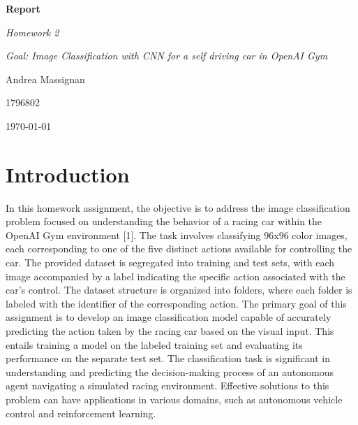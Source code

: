 \documentclass{article}
\begin{document}
\begin{titlepage}
    \centering
    \vspace*{2cm}
    {\Huge\bfseries Report\par}
    \vspace{2cm}
    {\Large\itshape Homework 2\par}
    \vspace{0.5cm}
    {\large\itshape Goal: Image Classification with CNN for a self driving car in OpenAI Gym\par}
    \vfill
    {\Large Andrea Massignan\par}
    {\Large 1796802\par}
    \vfill
    {\large\today\par}
\end{titlepage}

\section{Introduction}

In this homework assignment, the objective is to address the image classification problem focused on understanding the behavior of a racing car within the OpenAI Gym environment [1]. The task involves classifying 96x96 color images, each corresponding to one of the five distinct actions available for controlling the car.
\newline
\newline
The provided dataset is segregated into training and test sets, with each image accompanied by a label indicating the specific action associated with the car's control. The dataset structure is organized into folders, where each folder is labeled with the identifier of the corresponding action.
\newline
\newline
The primary goal of this assignment is to develop an image classification model capable of accurately predicting the action taken by the racing car based on the visual input. This entails training a model on the labeled training set and evaluating its performance on the separate test set.
\newline
\newline
The classification task is significant in understanding and predicting the decision-making process of an autonomous agent navigating a simulated racing environment. Effective solutions to this problem can have applications in various domains, such as autonomous vehicle control and reinforcement learning.
\end{document}
